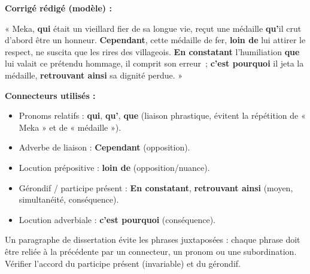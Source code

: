 \documentclass[11pt]{article}
\begin{document}
\begin{corrige}
\textbf{Corrigé rédigé (modèle) :}

« Meka, \textbf{qui} était un vieillard fier de sa longue vie, reçut une médaille \textbf{qu'}il crut d'abord être un honneur. \textbf{Cependant}, cette médaille de fer, \textbf{loin de} lui attirer le respect, ne suscita que les rires des villageois. \textbf{En constatant} l'humiliation \textbf{que} lui valait ce prétendu hommage, il comprit son erreur~; \textbf{c'est pourquoi} il jeta la médaille, \textbf{retrouvant ainsi} sa dignité perdue. »

\textbf{Connecteurs utilisés :}
\begin{itemize}
\item Pronoms relatifs : \textbf{qui}, \textbf{qu'}, \textbf{que} (liaison phrastique, évitent la répétition de « Meka » et de « médaille »).
\item Adverbe de liaison : \textbf{Cependant} (opposition).
\item Locution prépositive : \textbf{loin de} (opposition/nuance).
\item Gérondif / participe présent : \textbf{En constatant}, \textbf{retrouvant ainsi} (moyen, simultanéité, conséquence).
\item Locution adverbiale : \textbf{c'est pourquoi} (conséquence).
\end{itemize}
\end{corrige}

\begin{attention}
Un paragraphe de dissertation évite les phrases juxtaposées : chaque phrase doit être reliée à la précédente par un connecteur, un pronom ou une subordination. Vérifier l'accord du participe présent (invariable) et du gérondif.
\end{attention}
\end{document}
